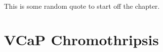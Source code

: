 \begin{savequote}[75mm]
This is some random quote to start off the chapter.
\end{savequote}

\chapter{VCaP Chromothripsis}
